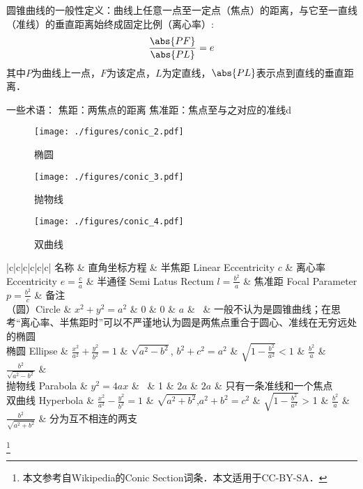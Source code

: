 
\begin{issues}
\issueDraft
\end{issues}

圆锥曲线的一般性定义：曲线上任意一点至一定点（焦点）的距离，与它至一直线（准线）的垂直距离始终成固定比例（离心率）:
$$\frac{\abs{PF}}{\abs{PL}}=e$$
其中$P$为曲线上一点，$F$为该定点，$L$为定直线，$\abs{PL}$表示点到直线的垂直距离．

一些术语：
焦距：两焦点的距离
焦准距：焦点至与之对应的准线d
\begin{figure}[ht]
\centering
\texttt{[image: ./figures/conic\_2.pdf]}
\caption{椭圆} \label{conic_fig2}
\end{figure}

\begin{figure}[ht]
\centering
\texttt{[image: ./figures/conic\_3.pdf]}
\caption{抛物线} \label{conic_fig3}
\end{figure}

\begin{figure}[ht]
\centering
\texttt{[image: ./figures/conic\_4.pdf]}
\caption{双曲线} \label{conic_fig4}
\end{figure}

\begin{table}[ht]
\centering
\caption{圆锥曲线}\label{conic_tab1}
\begin{tabular}{|c|c|c|c|c|c|}
\hline
名称 & 直角坐标方程 & 半焦距 Linear Eccentricity $c$ & 离心率 Eccentricity $e = \frac{c}{a}$ & 半通径 Semi Latus Rectum $l=\frac{b^2}{a}$ & 焦准距 Focal Parameter$p=\frac{b^2}{c}$ & 备注\\
\hline
（圆）Circle & $x^2+y^2=a^2$ & 0 & 0 & $a$ & \ & 一般不认为是圆锥曲线；在思考“离心率、半焦距时”可以不严谨地认为圆是两焦点重合于圆心、准线在无穷远处的椭圆\\
\hline
椭圆 Ellipse & $\frac{x^2}{a^2} + \frac{y^2}{b^2} = 1$ & $\sqrt{a^2-b^2}$, $b^2+c^2=a^2$ & $\sqrt{1-\frac{b^2}{a^2}} < 1$ & $\frac{b^2}{a}$ & $\frac{b^2}{\sqrt{a^2-b^2}}$ &  \\
\hline
抛物线 Parabola & $y^2=4ax$ & \ & 1 & $2a$ & $2a$ & 只有一条准线和一个焦点\\
\hline
双曲线 Hyperbola & $\frac{x^2}{a^2} - \frac{y^2}{b^2} = 1$ & $\sqrt{a^2+b^2}$,$a^2+b^2=c^2$ & $\sqrt{1-\frac{b^2}{a^2}}$ > 1 & $\frac{b^2}{a}$ & $\frac{b^2}{\sqrt{a^2+b^2}}$ & 分为互不相连的两支 \\
\hline
\end{tabular}
\end{table}
\footnote{本文参考自Wikipedia的Conic Section词条．本文适用于CC-BY-SA．}
